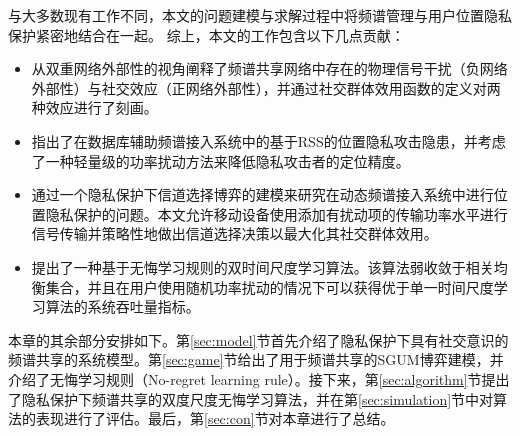 与大多数现有工作不同，本文的问题建模与求解过程中将频谱管理与用户位置隐私保护紧密地结合在一起。
综上，本文的工作包含以下几点贡献：
\begin{itemize}
\item 从双重网络外部性的视角阐释了频谱共享网络中存在的物理信号干扰（负网络外部性）与社交效应（正网络外部性），并通过社交群体效用函数的定义对两种效应进行了刻画。
\item 指出了在数据库辅助频谱接入系统中的基于RSS的位置隐私攻击隐患，并考虑了一种轻量级的功率扰动方法来降低隐私攻击者的定位精度。
\item 通过一个隐私保护下信道选择博弈的建模来研究在动态频谱接入系统中进行位置隐私保护的问题。本文允许移动设备使用添加有扰动项的传输功率水平进行信号传输并策略性地做出信道选择决策以最大化其社交群体效用。
\item 提出了一种基于无悔学习规则的双时间尺度学习算法。该算法弱收敛于相关均衡集合，并且在用户使用随机功率扰动的情况下可以获得优于单一时间尺度学习算法的系统吞吐量指标。
\end{itemize}
本章的其余部分安排如下。第\ref{sec:model}节首先介绍了隐私保护下具有社交意识的频谱共享的系统模型。第\ref{sec:game}节给出了用于频谱共享的SGUM博弈建模，并介绍了{\kaishu 无悔学习规则}（No-regret learning rule）。接下来，第\ref{sec:algorithm}节提出了隐私保护下频谱共享的双度尺度无悔学习算法，并在第\ref{sec:simulation}节中对算法的表现进行了评估。最后，第\ref{sec:con}节对本章进行了总结。
